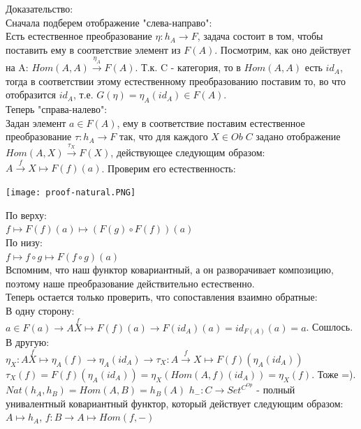 \documentclass[a4paper]{article}
\theoremstyle{indented}
\theoremstyle{definition}
\theoremstyle{remark}
\DeclareMathOperator{\ra}{\rightarrow}
\begin{document}
Доказательство:\\
Сначала подберем отображение "слева-направо": \\
Есть естественное преобразование $\eta: h_A \ra F$, задача состоит в том, чтобы поставить ему в соответствие элемент из $F(A)$. Посмотрим, как оно действует на A: $Hom(A, A) \stackrel{\eta_A}{\ra} F(A)$. Т.к. C - категория, то в $Hom(A, A)$ есть $id_A$, тогда в соответствии этому естественному преобразованию поставим то, во что отобразится $id_A$, т.е. $G(\eta) = \eta_A(id_A) \in F(A)$. \\
Теперь "справа-налево": \\
Задан элемент $a \in F(A)$, ему в соответствие поставим естественное преобразование $\tau: h_A \ra F$ так, что для каждого $X \in Ob\;C$ задано отображение $Hom(A, X) \stackrel{\tau_X}{\ra} F(X)$, действующее следующим образом: $A \stackrel{f}{\ra} X \mapsto F(f)(a)$. Проверим его естественность: \\
\begin{center}\texttt{[image: proof-natural.PNG]}\end{center}
По верху: \\
$f \mapsto F(f)(a) \mapsto (F(g) \circ F(f))(a)$ \\
По низу: \\
$f \mapsto f \circ g \mapsto F(f \circ g)(a)$ \\
Вспомним, что наш функтор ковариантный, а он разворачивает композицию, поэтому наше преобразование действительно естественно. \\
Теперь остается только проверить, что сопоставления взаимно обратные: \\
В одну сторону: \\
$a \in F(a) \longrightarrow A \stackrel{f}{X} \mapsto F(f)(a) \longrightarrow F(id_A)(a) = id_{F(A)}(a) = a$. Сошлось. \\
В другую: \\
$\eta_X: A \stackrel{f}{X} \mapsto \eta_A(f) \longrightarrow \eta_A(id_A) \longrightarrow \tau_X: A \stackrel{f}{\ra} X \mapsto F(f)(\eta_A(id_A))$ \\
$\tau_X(f) = F(f)(\eta_A(id_A)) = \eta_X(Hom(A, f)(id_A)) = \eta_X(f)$. Тоже =).
\cons $Nat(h_A, h_B) = Hom(A, B) = h_B(A)$
\cons {} $h_-: C \ra Set^{C^{Op}}$ - полный унивалентный ковариантный функтор, который действует следующим образом: $A \mapsto h_A$, $f: B \ra A \mapsto Hom(f, -)$
\end{document}
